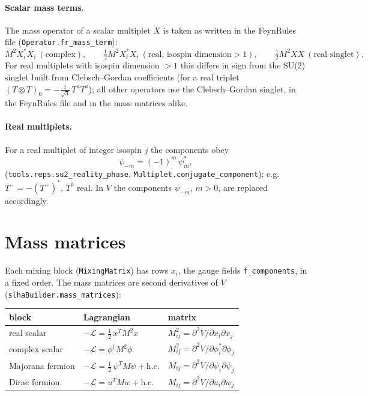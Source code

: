 \documentclass[11pt]{article}
\newcommand{\code}[1]{\texttt{#1}}
\begin{document}
\paragraph{Scalar mass terms.} The mass operator of a scalar multiplet $X$ is taken as written
in the FeynRules file (\code{Operator.fr\_mass\_term}):
\begin{equation}
  M^2 X^*_i X_i \ (\text{complex}),\qquad
  \tfrac12 M^2 X^*_i X_i \ (\text{real, isospin dimension} > 1),\qquad
  \tfrac12 M^2 X X \ (\text{real singlet}).
\end{equation}
For real multiplets with isospin dimension $> 1$ this differs in sign from the SU(2) singlet
built from Clebsch--Gordan coefficients (for a real triplet
$(T\otimes T)_0 = -\tfrac{1}{\sqrt3}\,T^aT^a$); all other operators use the Clebsch--Gordan
singlet, in the FeynRules file and in the mass matrices alike.

\paragraph{Real multiplets.} For a real multiplet of integer isospin $j$ the components obey
\begin{equation}
  \psi_{-m} = (-1)^m\, \psi_m^* ,
\end{equation}
(\code{tools.reps.su2\_reality\_phase}, \code{Multiplet.conjugate\_component}); e.g.\
$T^- = -(T^+)^*$, $T^0$ real. In $V$ the components $\psi_{-m}$, $m>0$, are replaced
accordingly.

\section{Mass matrices}

Each mixing block (\code{MixingMatrix}) has rows $x_i$, the gauge fields
\code{f\_components}, in a fixed order. The mass matrices are second derivatives of $V$
(\code{slhaBuilder.mass\_matrices}):

\begin{center}
\begin{tabular}{lll}
\toprule
block & Lagrangian & matrix \\ \midrule
real scalar     & $-\mathcal L = \tfrac12\, x^T M^2 x$          & $M^2_{ij} = \partial^2 V/\partial x_i\partial x_j$ \\
complex scalar  & $-\mathcal L = \phi^\dagger M^2 \phi$         & $M^2_{ij} = \partial^2 V/\partial \phi^*_i\partial \phi_j$ \\
Majorana fermion& $-\mathcal L = \tfrac12\, \psi^T M \psi + \text{h.c.}$ & $M_{ij} = \partial^2 V/\partial \psi_i\partial \psi_j$ \\
Dirac fermion   & $-\mathcal L = u^T M w + \text{h.c.}$         & $M_{ij} = \partial^2 V/\partial u_i\partial w_j$ \\
\bottomrule
\end{tabular}
\end{center}
\end{document}
